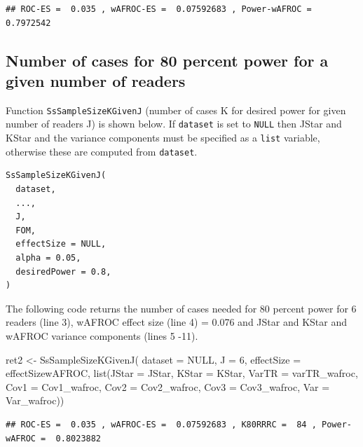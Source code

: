 \documentclass[
]{book}
\newenvironment{Shaded}{\begin{snugshade}}{\end{snugshade}}
\newcommand{\AttributeTok}[1]{\textcolor[rgb]{0.77,0.63,0.00}{#1}}
\newcommand{\ConstantTok}[1]{\textcolor[rgb]{0.00,0.00,0.00}{#1}}
\newcommand{\DecValTok}[1]{\textcolor[rgb]{0.00,0.00,0.81}{#1}}
\newcommand{\FunctionTok}[1]{\textcolor[rgb]{0.00,0.00,0.00}{#1}}
\newcommand{\NormalTok}[1]{#1}
\newcommand{\OtherTok}[1]{\textcolor[rgb]{0.56,0.35,0.01}{#1}}
\begin{document}
\begin{verbatim}
## ROC-ES =  0.035 , wAFROC-ES =  0.07592683 , Power-wAFROC =  0.7972542
\end{verbatim}

\hypertarget{number-of-cases-for-80-percent-power-for-a-given-number-of-readers}{%
\subsection{Number of cases for 80 percent power for a given number of readers}\label{number-of-cases-for-80-percent-power-for-a-given-number-of-readers}}

Function \texttt{SsSampleSizeKGivenJ} (number of cases K for desired power for given number of readers J) is shown below. If \texttt{dataset} is set to \texttt{NULL} then JStar and KStar and the variance components must be specified as a \texttt{list} variable, otherwise these are computed from \texttt{dataset}.

\begin{verbatim}
SsSampleSizeKGivenJ(
  dataset,
  ...,
  J,
  FOM,
  effectSize = NULL,
  alpha = 0.05,
  desiredPower = 0.8,
)
\end{verbatim}

The following code returns the number of cases needed for 80 percent power for 6 readers (line 3), wAFROC effect size (line 4) = 0.076 and JStar and KStar and wAFROC variance components (lines 5 -11).

\begin{Shaded}
\begin{Highlighting}[numbers=left,,]
\NormalTok{ret2 }\OtherTok{\textless{}{-}} \FunctionTok{SsSampleSizeKGivenJ}\NormalTok{(}
  \AttributeTok{dataset =} \ConstantTok{NULL}\NormalTok{, }
  \AttributeTok{J =} \DecValTok{6}\NormalTok{, }
  \AttributeTok{effectSize =}\NormalTok{ effectSizewAFROC, }
  \FunctionTok{list}\NormalTok{(}\AttributeTok{JStar =}\NormalTok{ JStar, }
       \AttributeTok{KStar =}\NormalTok{ KStar, }
       \AttributeTok{VarTR =}\NormalTok{ varTR\_wafroc,}
       \AttributeTok{Cov1 =}\NormalTok{ Cov1\_wafroc,}
       \AttributeTok{Cov2 =}\NormalTok{ Cov2\_wafroc,}
       \AttributeTok{Cov3 =}\NormalTok{ Cov3\_wafroc,}
       \AttributeTok{Var =}\NormalTok{ Var\_wafroc))}
\end{Highlighting}
\end{Shaded}

\begin{verbatim}
## ROC-ES =  0.035 , wAFROC-ES =  0.07592683 , K80RRRC =  84 , Power-wAFROC =  0.8023882
\end{verbatim}
\end{document}
